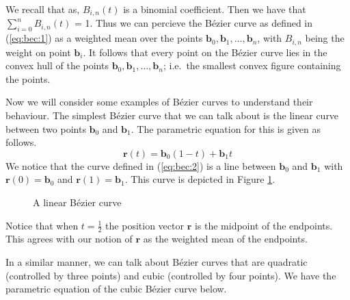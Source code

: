 \documentclass{article}
\begin{document}
We recall that as, $B_{i,n}(t)$ is a binomial coefficient.
Then we have that  $\sum_{i=0}^n B_{i,n}(t)$ = 1.
Thus we can percieve the B\'ezier curve as defined in (\ref{eq:bec:1}) as a weighted mean over the points $\mathbf{b}_0, \mathbf{b}_1, \dots, \mathbf{b}_n$, with $B_{i,n}$ being the weight on point $\mathbf{b}_i$. %
It follows that every point on the B\'ezier curve lies in the convex hull of the points $\mathbf{b}_0, \mathbf{b}_1, \dots, \mathbf{b}_n$; i.e.\ the smallest convex figure containing the points.

Now we will consider some examples of B\'ezier curves to understand their behaviour.
The simplest B\'ezier curve that we can talk about is the linear curve between two points $\mathbf{b}_0$ and $\mathbf{b}_1$.
The parametric equation for this is given as follows.
\begin{equation}
  \label{eq:bec:2}
  \mathbf{r}(t) = \mathbf{b}_0 (1 - t) + \mathbf{b}_1 t
\end{equation}
We notice that the curve defined in (\ref{eq:bec:2}) is a line between $\mathbf{b}_0$ and $\mathbf{b}_1$ with $\mathbf{r}(0) = \mathbf{b}_0$ and $\mathbf{r}(1) = \mathbf{b}_1$. This curve is depicted in Figure \ref{fig:bec:1}.
\begin{figure}[h]
  \centering
  \caption{A linear B\'ezier curve}
  \label{fig:bec:1}
\end{figure}
Notice that when $t = \frac{1}{2}$ the position vector $\mathbf{r}$ is the midpoint of the endpoints.
This agrees with our notion of $\mathbf{r}$ as the weighted mean of the endpoints.

In a similar manner, we can talk about B\'ezier curves that are quadratic (controlled by three points) and cubic (controlled by four points). We have the parametric equation of the cubic B\'ezier curve below.
\end{document}
